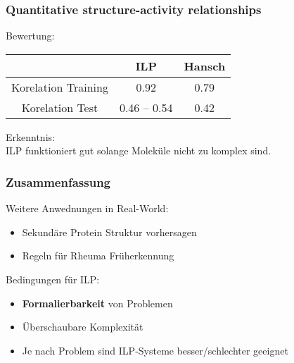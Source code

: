 \begin{frame}
	\frametitle{Quantitative structure-activity relationships}
	Bewertung:
	\begin{center}
		\begin{tabular}{|c|c|c|}
			\hline
			& ILP & Hansch\\
			\hline
			Korelation Training & 0.92 & 0.79\\
			\hline
			Korelation Test     & 0.46 -- 0.54 & 0.42\\
			\hline
		\end{tabular}
		\end{center}
		Erkenntnis:\\
		ILP funktioniert gut solange Moleküle nicht zu komplex sind.
\end{frame}

\begin{frame}
	\frametitle{Zusammenfassung}
	Weitere Anwednungen in Real-World:
	\begin{itemize}
		\item Sekundäre Protein Struktur vorhersagen
		\item Regeln für Rheuma Früherkennung
	\end{itemize}

	Bedingungen für ILP:
	\begin{itemize}
		\item \textbf{Formalierbarkeit} von Problemen
		\item Überschaubare Komplexität
		\item Je nach Problem sind ILP-Systeme besser/schlechter geeignet
	\end{itemize}
	
\end{frame}

